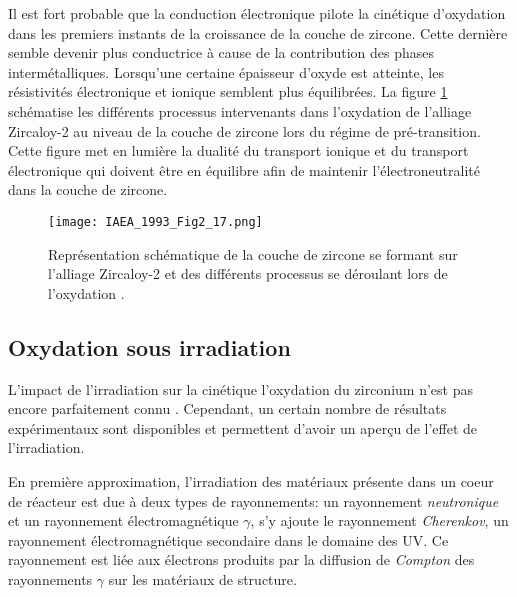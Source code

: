 \begin{refsection}


    Il est fort probable que la conduction électronique pilote la cinétique d'oxydation dans les premiers instants de la
    croissance de la couche de zircone. Cette dernière semble devenir plus conductrice à cause de la contribution des
    phases intermétalliques. Lorsqu'une certaine épaisseur d'oxyde est atteinte, les résistivités électronique et
    ionique semblent plus équilibrées.  La figure \ref{fig:oxide_film_diagram} schématise les différents processus
    intervenants dans l'oxydation de l'alliage Zircaloy-2 au niveau de la couche de zircone lors du régime de
    pré-transition. Cette figure met en lumière la dualité du transport ionique et du transport électronique qui
    doivent être en équilibre afin de maintenir l'électroneutralité dans la couche de zircone.
    
    \begin{figure}[H]
        \centering
        \texttt{[image: IAEA\_1993\_Fig2\_17.png]}
        \caption[Représentation schématique de la couche de zircone se formant sur l'alliage Zircaloy-2 et des différents
    processus se déroulant lors de l'oxydation.]{Représentation schématique de la couche de zircone se formant sur
    l'alliage Zircaloy-2 et des différents processus se déroulant lors de l'oxydation \citep{IAEA1998}.}
        \label{fig:oxide_film_diagram}
    \end{figure}


    \subsection{Oxydation sous irradiation}\label{subsec:with_irradiation}

    L'impact de l’irradiation sur la cinétique l'oxydation du zirconium n'est pas encore parfaitement connu
    \citep{IAEA1998}. Cependant, un certain nombre de résultats expérimentaux sont disponibles et permettent d'avoir un aperçu de
    l'effet de l'irradiation. 
    
    En première approximation, l'irradiation des matériaux présente dans un coeur de réacteur est due à deux
    types de rayonnements: un rayonnement \emph{neutronique} et un rayonnement électromagnétique $\gamma$, s'y ajoute le
    rayonnement \emph{Cherenkov}, un rayonnement électromagnétique secondaire dans le domaine des UV. 
    Ce rayonnement est liée aux électrons produits par la diffusion de \emph{Compton} des rayonnements $\gamma$ sur les
    matériaux de structure. 
    

\end{refsection}
